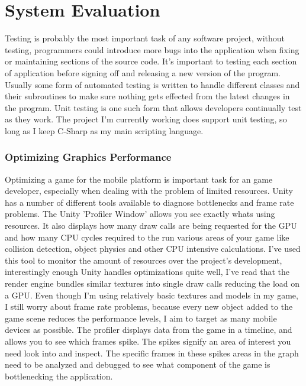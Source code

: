 \chapter{System Evaluation}
Testing is probably the most important task of any software project, without testing, programmers could introduce more bugs into the application when fixing or maintaining sections of the source code. It's important to testing each section of application before signing off and releasing a new version of the program. Usually some form of automated testing is written to handle different classes and their subroutines to make sure nothing gets effected from the latest changes in the program. Unit testing is one such form that allows developers continually test as they work. The project I'm currently working does support unit testing, so long as I keep C-Sharp as my main scripting language.
\subsection{Optimizing Graphics Performance}
Optimizing a game for the mobile platform is important task for an game developer, especially when dealing with the problem of limited resources.
Unity has a number of different tools available to diagnose bottlenecks and frame rate problems. The Unity 'Profiler Window' allows you see exactly whats using resources. It also displays how many draw calls are being requested for the GPU and how many CPU cycles required to the run various areas of your game like collision detection, object physics and other CPU intensive calculations. I've used this tool to monitor the amount of resources over the project's development, interestingly enough Unity handles optimizations quite well, I've read that the render engine bundles similar textures into single draw calls reducing the load on a GPU. Even though I'm using relatively basic textures and models in my game, I still worry about frame rate problems, because every new object added to the game scene reduces the performance levels, I aim to target as many mobile devices as possible. The profiler displays data from the game in a timeline, and allows you to see which frames spike. The spikes signify an area of interest you need look into and inspect. The specific frames in these spikes areas in the graph need to be analyzed and debugged to see what component of the game is bottlenecking the application.
